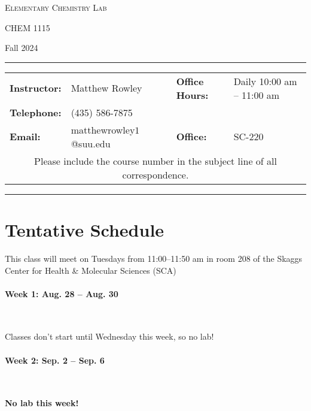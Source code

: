 \documentclass[12pt, letterpaper]{article}
\begin{document}
\begin{center}
	{\Large \textsc{Elementary Chemistry Lab}}

	CHEM 1115
\end{center}

\begin{center}
	{\large Fall 2024}
\end{center}
\begin{center}
	\rule{0.99\textwidth}{0.4pt}
	\begin{tabular}{llcll}
		\textbf{Instructor:} & Matthew Rowley           &  & \textbf{Office Hours:} & Daily 10:00 am -- 11:00 am \\
		\textbf{Telephone:}  & (435) 586-7875           &  &                        &  \\
		\textbf{Email:}      & matthewrowley$1$@suu.edu &  & \textbf{Office:}       & SC-220                   \\
		\multicolumn{5}{c}{Please include the course number in the subject line of all correspondence.}
	\end{tabular}
	\rule{0.99\textwidth}{0.4pt}
\end{center}

\section*{Tentative Schedule}
This class will meet on Tuesdays from 11:00--11:50 am in room 208 of the Skaggs Center for Health \& Molecular Sciences (SCA)

\paragraph{Week 1: Aug. 28 -- Aug. 30}~

Classes don't start until Wednesday this week, so no lab!

\paragraph{Week 2: Sep. 2 -- Sep. 6}~

\textbf{No lab this week!}
\end{document}
